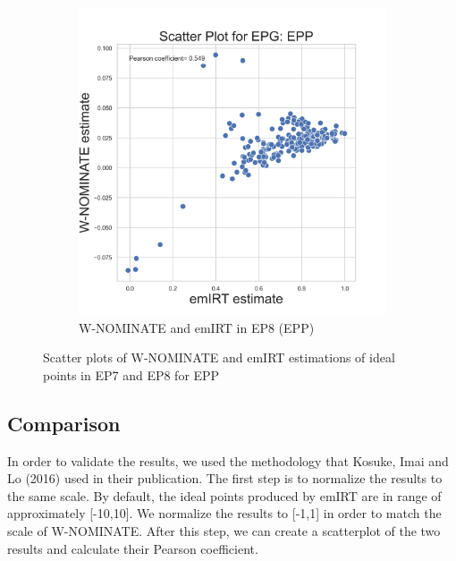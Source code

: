 \documentclass[a4paper,12pt]{report}
\begin{document}
\begin{figure}[H]
\begin{subfigure}[b]{0.48\textwidth}
            \includegraphics[width=\textwidth]{Graphs/ScatterEMWNOMINATE_8_EPG_EPP}
            \caption{W-NOMINATE and emIRT in EP8 (EPP)}
            \label{fig:WNOMINATE_EPPSCATTER_8}
        \end{subfigure}
        \caption{Scatter plots of W-NOMINATE and emIRT estimations of ideal points in EP7 and EP8 for EPP}
        \label{fig:WNOMINATE_SCATTER_EPP}
    \end{figure}

    \subsection{Comparison}
    In order to validate the results, we used the methodology that Kosuke, Imai and Lo (2016) used in their
    publication.
    The first step is to normalize the results to the same scale.
    By default, the ideal points produced by emIRT are in range of approximately [-10,10].
    We normalize the results to [-1,1] in order to match the scale of W-NOMINATE. After this step, we can create a
    scatterplot of the two results and calculate their Pearson
    coefficient.
\end{document}
